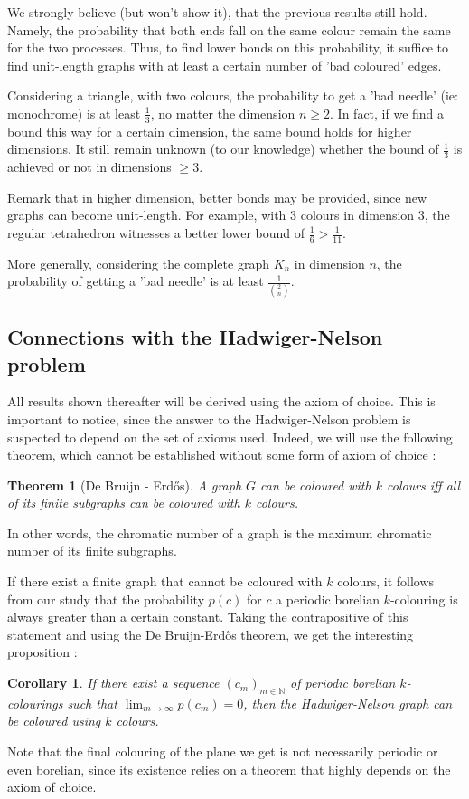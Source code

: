 \documentclass[a4paper,11pt]{article}
\newtheorem{cons}{Corollary}
\newtheorem{theo}{Theorem}
\theoremstyle{definition}
\theoremstyle{remark}
\begin{document}
We strongly believe (but won't show it), that the previous results still hold. Namely, the probability that both ends fall on the same colour remain the same for the two processes. Thus, to find lower bonds on this probability, it suffice to find unit-length graphs with at least a certain number of 'bad coloured' edges.

Considering a triangle, with two colours, the probability to get a 'bad needle' (ie: monochrome) is at least $\frac{1}{3}$, no matter the dimension $n \geq 2$. In fact, if we find a bound this way for a certain dimension, the same bound holds for higher dimensions. It still remain unknown (to our knowledge) whether the bound of $\frac{1}{3}$ is achieved or not in dimensions $\geq 3$. 


Remark that in higher dimension, better bonds may be provided, since new graphs can 
become unit-length. For example, with $3$ colours in dimension $3$, the regular 
tetrahedron witnesses a better lower bound 
of $\frac 1 6 >\frac 1 {11}$.


More generally, considering the complete graph $K_n$ in dimension $n$, the probability of getting 
a 'bad needle' is at least $ \frac{1}{\binom 2 n}$.

\subsection{Connections with the Hadwiger-Nelson problem} \label{hn}
All results shown thereafter will be derived using the axiom of choice. 
This is important to notice, since the answer to the Hadwiger-Nelson problem is 
suspected to depend on the set of axioms used. Indeed, we will use the 
following theorem, which cannot be established without some form of axiom of 
choice :
\begin{theo}[De Bruijn - Erdős]
 A graph $G$ can be coloured with $k$ colours iff all of its finite subgraphs 
 can be coloured with $k$ colours.
\end{theo}
In other words, the chromatic number of a graph is the maximum chromatic number 
of its finite subgraphs.

If there exist a finite graph that cannot be coloured with $k$ colours, it 
follows from our study that the probability $p(c)$ for $c$ a periodic borelian 
$k$-colouring is always greater than a certain constant. Taking the 
contrapositive of this statement and using the De Bruijn-Erdős theorem, we get  
the interesting proposition :
\begin{cons}
 If there exist a sequence $(c_m)_{m \in \mathbb{N}}$ of periodic borelian 
 $k$-colourings such that $\lim_{m \to \infty} p(c_m) = 0$, then the 
 Hadwiger-Nelson graph can be coloured using $k$ colours.
\end{cons}
Note that the final colouring of the plane we get is not necessarily periodic 
or even borelian, since its existence relies on a theorem that highly depends 
on the axiom of choice.
\end{document}
